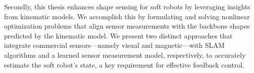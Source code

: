 Secondly, this thesis enhances shape sensing for soft robots by leveraging insights from kinematic models. We accomplish this by formulating and solving nonlinear optimization problems that align sensor measurements with the backbone shapes predicted by the kinematic model. We present two distinct approaches that integrate commercial sensors—namely visual and magnetic—with SLAM algorithms and a learned sensor measurement model, respectively, to accurately estimate the soft robot’s state, a key requirement for effective feedback control.

